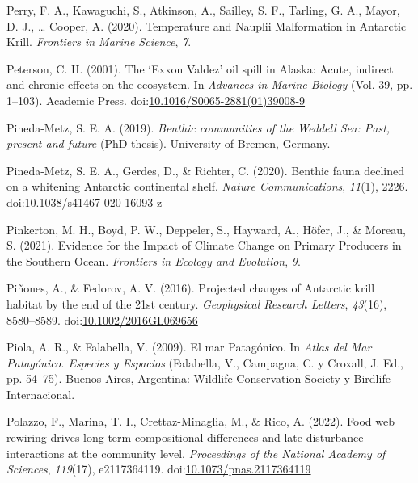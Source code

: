 \documentclass[
]{article}
\newlength{\cslhangindent}
\newlength{\cslentryspacingunit} %
\newenvironment{CSLReferences}[2] %
 {%
  \setlength{\parindent}{0pt}
  \ifodd #1
  \let\oldpar\par
  \def\par{\hangindent=\cslhangindent\oldpar}
  \fi
  \setlength{\parskip}{#2\cslentryspacingunit}
 }%
 {}
\begin{document}
\begin{CSLReferences}{1}{0}
\leavevmode{}%
Perry, F. A., Kawaguchi, S., Atkinson, A., Sailley, S. F., Tarling, G.
A., Mayor, D. J., \ldots{} Cooper, A. (2020).
Temperature and {Nauplii
Malformation} in {Antarctic Krill}. \emph{Frontiers in Marine Science},
\emph{7}.

\leavevmode{}%
Peterson, C. H. (2001). The {`{Exxon Valdez}'} oil spill in {Alaska}:
{Acute}, indirect and chronic effects on the ecosystem. In
\emph{Advances in {Marine Biology}} (Vol. 39, pp. 1--103). {Academic
Press}.
doi:\href{https://doi.org/10.1016/S0065-2881(01)39008-9}{10.1016/S0065-2881(01)39008-9}

\leavevmode{}%
Pineda-Metz, S. E. A. (2019). \emph{Benthic communities of the {Weddell
Sea}: Past, present and future} (PhD thesis). University of Bremen,
{Germany}.

\leavevmode{}%
Pineda-Metz, S. E. A., Gerdes, D., \& Richter, C. (2020). Benthic fauna
declined on a whitening {Antarctic} continental shelf. \emph{Nature
Communications}, \emph{11}(1), 2226.
doi:\href{https://doi.org/10.1038/s41467-020-16093-z}{10.1038/s41467-020-16093-z}

\leavevmode{}%
Pinkerton, M. H., Boyd, P. W., Deppeler, S., Hayward, A., Höfer, J., \&
Moreau, S. (2021). Evidence for the {Impact} of {Climate Change} on
{Primary Producers} in the {Southern Ocean}. \emph{Frontiers in Ecology
and Evolution}, \emph{9}.

\leavevmode{}%
Piñones, A., \& Fedorov, A. V. (2016). Projected changes of {Antarctic}
krill habitat by the end of the 21st century. \emph{Geophysical Research
Letters}, \emph{43}(16), 8580--8589.
doi:\href{https://doi.org/10.1002/2016GL069656}{10.1002/2016GL069656}

\leavevmode{}%
Piola, A. R., \& Falabella, V. (2009). {El mar Patagónico}. In
\emph{{Atlas del Mar Patagónico. Especies y Espacios}} (Falabella, V.,
Campagna, C. y Croxall, J. Ed., pp. 54--75). {Buenos Aires, Argentina}:
{Wildlife Conservation Society y Birdlife Internacional}.

\leavevmode{}%
Polazzo, F., Marina, T. I., Crettaz-Minaglia, M., \& Rico, A. (2022).
Food web rewiring drives long-term compositional differences and
late-disturbance interactions at the community level. \emph{Proceedings
of the National Academy of Sciences}, \emph{119}(17), e2117364119.
doi:\href{https://doi.org/10.1073/pnas.2117364119}{10.1073/pnas.2117364119}


\end{CSLReferences}
\end{document}
